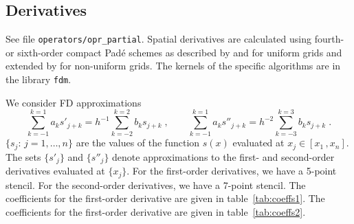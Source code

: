 \subsection{Derivatives}\label{sec:fdm}

See file {\tt operators/opr\_partial}. Spatial derivatives are calculated using fourth- or sixth-order compact Pad\'{e} schemes as described by \cite{Lele:1992} and \cite{Lamballais:2011} for uniform grids and extended by \cite{Shukla:2005} for non-uniform grids. The kernels of the specific algorithms are in the library {\tt fdm}.

We consider FD approximations
\begin{equation}
  \sum_{k=-1}^{k=1}a_ks'_{j+k}=h^{-1}\sum_{k=-2}^{k=2}b_ks_{j+k} \;,\qquad
  \sum_{k=-1}^{k=1}a_ks''_{j+k}=h^{-2}\sum_{k=-3}^{k=3}b_ks_{j+k} \;.
  \label{equ:coefs}
\end{equation}
$\{s_j:\, j=1,\ldots,n\}$ are the values of the function $s(x)$ evaluated at $x_j\in[x_1\,,x_n]$. The sets $\{s'_j\}$ and $\{s''_j\}$ denote approximations to the first- and second-order derivatives evaluated at $\{x_j\}$. For the first-order derivatives, we have a 5-point stencil. For the second-order derivatives, we have a 7-point stencil. The coefficients for the first-order derivative are given in table~\ref{tab:coeffs1}. The coefficients for the first-order derivative are given in table~\ref{tab:coeffs2}.

